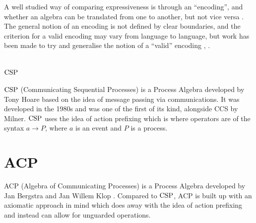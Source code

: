 \documentclass[../hons_project.tex]{subfiles}
\begin{document}

A well studied way of comparing expressiveness is through an ``encoding'', and whether an algebra can be translated from one to another, but not vice versa \citep{petersComparingProcessCalculi2019}. The general notion of an encoding is not defined by clear boundaries, and the criterion for a valid encoding may vary from language to language, but work has been made to try and generalise the notion of a ``valid'' encoding \citep{gorlaUnifiedApproachEncodability2010}, \citep{DBLP:conf/fossacs/Glabbeek18}.

\section{\texorpdfstring{$\mathrm{CSP}$}{CSP}}
$\mathrm{CSP}$ (Communicating Sequential Processes) \citep{brookesTheoryCommunicatingSequential1984} is a Process Algebra developed by Tony Hoare based on the idea of message passing via communications. It was developed in the 1980s and was one of the first of its kind, alongside CCS by Milner. $\mathrm{CSP}$ uses the idea of action prefixing which is where operators are of the syntax $a \to P$, where $a$ is an event and $P$ is a process. 



\section{ACP}
ACP (Algebra of Communicating Processes) is a Process Algebra developed by Jan Bergstra and Jan Willem Klop \citep{bergstraProcessAlgebraSynchronous1984}. Compared to $\mathrm{CSP}$, ACP is built up with an axiomatic approach in mind which does away with the idea of action prefixing and instead can allow for unguarded operations.
\end{document}
